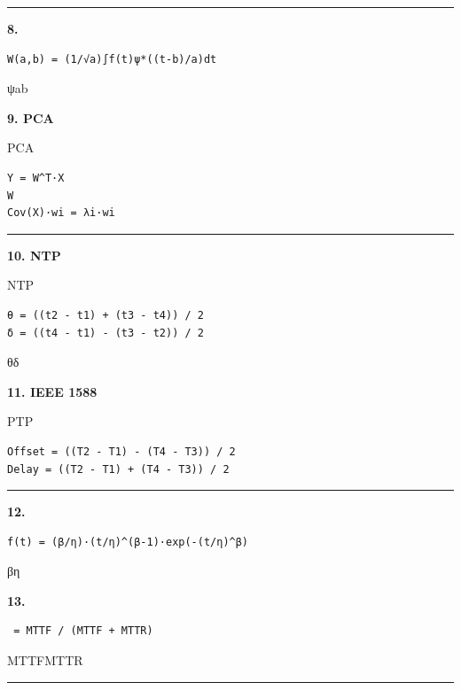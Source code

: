 \begin{center}\rule{0.5\linewidth}{0.5pt}\end{center}

\textbf{8. }

\begin{verbatim}
W(a,b) = (1/√a)∫f(t)ψ*((t-b)/a)dt
\end{verbatim}

ψab

\textbf{9. PCA}

PCA

\begin{verbatim}
Y = W^T·X
W
Cov(X)·wi = λi·wi
\end{verbatim}

\begin{center}\rule{0.5\linewidth}{0.5pt}\end{center}

\textbf{10. NTP}

NTP

\begin{verbatim}
θ = ((t2 - t1) + (t3 - t4)) / 2
δ = ((t4 - t1) - (t3 - t2)) / 2
\end{verbatim}

θδ

\textbf{11. IEEE 1588}

PTP

\begin{verbatim}
Offset = ((T2 - T1) - (T4 - T3)) / 2
Delay = ((T2 - T1) + (T4 - T3)) / 2
\end{verbatim}

\begin{center}\rule{0.5\linewidth}{0.5pt}\end{center}

\textbf{12. }

\begin{verbatim}
f(t) = (β/η)·(t/η)^(β-1)·exp(-(t/η)^β)
\end{verbatim}

βη

\textbf{13. }

\begin{verbatim}
 = MTTF / (MTTF + MTTR)
\end{verbatim}

MTTFMTTR

\begin{center}\rule{0.5\linewidth}{0.5pt}\end{center}

